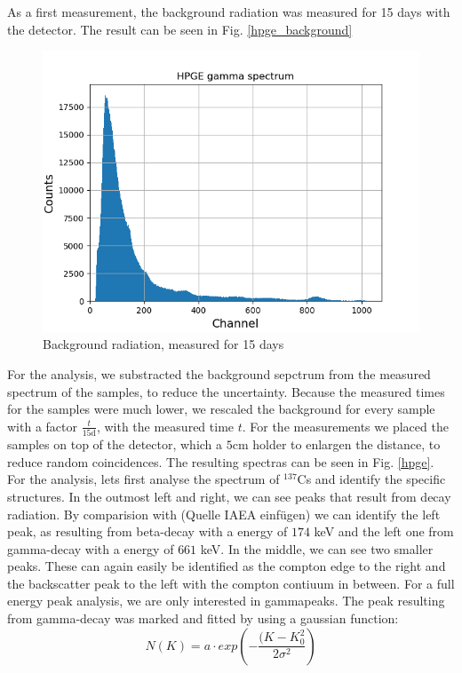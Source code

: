 As a first measurement, the background radiation was measured for 15 days with the detector.
The result can be seen in Fig. \ref{hpge_background}
\begin{figure}[h]
  \includegraphics[width=\linewidth]{../Plots/hgpe_untergrund.png}
  \caption{Background radiation, measured for 15 days}
  \label{hpge_untergrund}
\end{figure}
For the analysis, we substracted the background sepctrum from the measured spectrum of the samples, to reduce the uncertainty.
Because the measured times for the samples were much lower, we rescaled the background for every sample with a factor $\frac{t}{15 \text{d}}$, with the measured time $t$. 
For the measurements we placed the samples on top of the detector, which a $5$cm holder to enlargen the distance, to reduce random coincidences.
The resulting spectras can be seen in Fig. \ref{hpge}.
For the analysis, lets first analyse the spectrum of $^{137}$Cs and identify the specific structures.
In the outmost left and right, we can see peaks that result from decay radiation.
By comparision with (Quelle IAEA einfügen) we can identify the left peak, as resulting from beta-decay with a energy of $174$ keV and the left one from gamma-decay with a energy of $661$ keV.
In the middle, we can see two smaller peaks. These can again easily be identified as the compton edge to the right and the backscatter peak to the left with the compton contiuum in between.
For a full energy peak analysis, we are only interested in gammapeaks. 
The peak resulting from gamma-decay was marked and fitted by using a gaussian function:
\begin{equation}
N(K) = a \cdot exp \left( - \frac{(K - K_{0}^{2}}{2 \sigma ^{2}} \right)
\end {equation}
